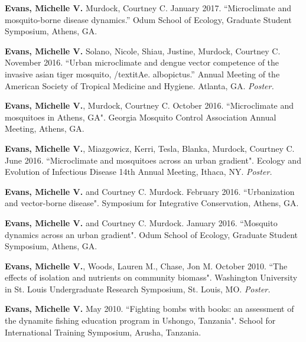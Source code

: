 
\begin{cvitems}
	\bigskip

	\item \textbf{Evans, Michelle V.} Murdock, Courtney C. January 2017. ``Microclimate and mosquito-borne disease dynamics.'' Odum School of Ecology, Graduate Student Symposium, Athens, GA.

	\item \textbf{Evans, Michelle V.} Solano, Nicole, Shiau, Justine, Murdock, Courtney C. November 2016. ``Urban microclimate and dengue vector competence of the invasive asian tiger mosquito, /textit{Ae. albopictus}.'' Annual Meeting of the American Society of Tropical Medicine and Hygiene. Atlanta, GA. \textit{Poster.}

	\item \textbf{Evans, Michelle V.}, Murdock, Courtney C. October 2016. ``Microclimate and mosquitoes in Athens, GA". Georgia Mosquito Control Association Annual Meeting, Athens, GA.

	\item \textbf{Evans, Michelle V.}, Miazgowicz, Kerri, Tesla, Blanka, Murdock, Courtney C. June 2016. ``Microclimate and mosquitoes across an urban gradient". Ecology and Evolution of Infectious Disease 14th Annual Meeting, Ithaca, NY. \textit{Poster.}

	\item \textbf{Evans, Michelle V.} and Courtney C. Murdock. February 2016. ``Urbanization and vector-borne disease". Symposium for Integrative Conservation, Athens, GA.

	\item \textbf{Evans, Michelle V.} and Courtney C. Murdock. January 2016. ``Mosquito dynamics across an urban gradient". Odum School of Ecology, Graduate Student Symposium, Athens, GA.

	\item \textbf{Evans, Michelle V.}, Woods, Lauren M., Chase, Jon M. October 2010. ``The effects of isolation and nutrients on community biomass". Washington University in St. Louis Undergraduate Research Symposium, St. Louis, MO. \textit{Poster.}

	\item \textbf{Evans, Michelle V.} May 2010. ``Fighting bombs with books: an assessment of the dynamite fishing education program in Ushongo, Tanzania". School for International Training Symposium, Arusha, Tanzania.

	\bigskip
\end{cvitems}

